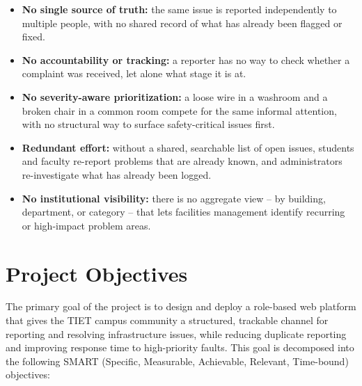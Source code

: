 \documentclass[11pt]{report}
\begin{document}
\begin{itemize}
  \item \textbf{No single source of truth:} the same issue is reported
    independently to multiple people, with no shared record of what has
    already been flagged or fixed.
  \item \textbf{No accountability or tracking:} a reporter has no way to
    check whether a complaint was received, let alone what stage it is
    at.
  \item \textbf{No severity-aware prioritization:} a loose wire in a
    washroom and a broken chair in a common room compete for the same
    informal attention, with no structural way to surface
    safety-critical issues first.
  \item \textbf{Redundant effort:} without a shared, searchable list of
    open issues, students and faculty re-report problems that are
    already known, and administrators re-investigate what has already
    been logged.
  \item \textbf{No institutional visibility:} there is no aggregate view
    -- by building, department, or category -- that lets facilities
    management identify recurring or high-impact problem areas.
\end{itemize}

\section{Project Objectives}

The primary goal of the project is to design and deploy a role-based web
platform that gives the TIET campus community a structured, trackable
channel for reporting and resolving infrastructure issues, while
reducing duplicate reporting and improving response time to
high-priority faults. This goal is decomposed into the following SMART
(Specific, Measurable, Achievable, Relevant, Time-bound) objectives:
\end{document}
